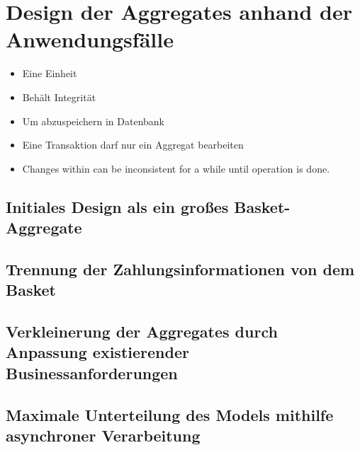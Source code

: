 \chapter{Design der Aggregates anhand der Anwendungsfälle}
\begin{itemize}[noitemsep,nolistsep]
	\item Eine Einheit
	\item Behält Integrität
	\item Um abzuspeichern in Datenbank
	\item Eine Transaktion darf nur ein Aggregat bearbeiten
	\item Changes within can be inconsistent for a while until operation is done.
\end{itemize}


\section{Initiales Design als ein großes Basket-Aggregate}
\blindtext

\section{Trennung der Zahlungsinformationen von dem Basket}
\blindtext

\section{Verkleinerung der Aggregates durch Anpassung existierender Businessanforderungen }
\blindtext

\section{Maximale Unterteilung des Models mithilfe asynchroner Verarbeitung }
\blindtext
